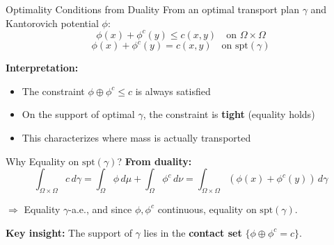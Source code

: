 \documentclass[aspectratio=169]{beamer}
\begin{document}
\begin{frame}{Optimality Conditions from Duality}
From an optimal transport plan $\gamma$ and Kantorovich potential $\phi$:
\[
\phi(x) + \phi^c(y) \leq c(x,y) \quad \text{on } \Omega \times \Omega
\]
\[
\phi(x) + \phi^c(y) = c(x,y) \quad \text{on } \text{spt}(\gamma)
\]

\vspace{0.4cm}
\textbf{Interpretation:}
\begin{itemize}
    \item The constraint $\phi \oplus \phi^c \leq c$ is always satisfied
    \item On the support of optimal $\gamma$, the constraint is \textbf{tight} (equality holds)
    \item This characterizes where mass is actually transported
\end{itemize}
\end{frame}

\begin{frame}{Why Equality on $\text{spt}(\gamma)$?}
\textbf{From duality:}
\[
\int_{\Omega \times \Omega} c \, d\gamma = \int_\Omega \phi \, d\mu + \int_\Omega \phi^c \, d\nu = \int_{\Omega \times \Omega} (\phi(x) + \phi^c(y)) \, d\gamma
\]

$\Rightarrow$ Equality $\gamma$-a.e., and since $\phi, \phi^c$ continuous, equality on $\text{spt}(\gamma)$.

\vspace{0.3cm}
\begin{center}
\end{center}

\textbf{Key insight:} The support of $\gamma$ lies in the \textbf{contact set} $\{\phi \oplus \phi^c = c\}$.
\end{frame}
\end{document}
